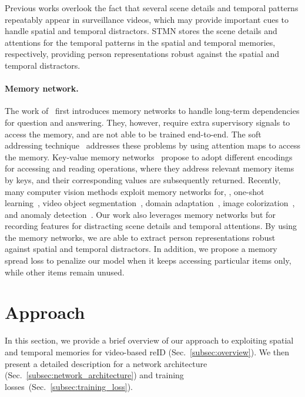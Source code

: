 \documentclass[10pt,twocolumn,letterpaper]{article}
\begin{document}
		Previous works overlook the fact that several scene details and temporal patterns repeatably appear in surveillance videos, which may provide important cues to handle spatial and temporal distractors. STMN stores the scene details and attentions for the temporal patterns in the spatial and temporal memories, respectively, providing person representations robust against the spatial and temporal distractors.
	
	\vspace{-0.4cm}
	\paragraph{Memory network.}
	
		The work of~\cite{weston2014memory} first introduces memory networks to handle long-term dependencies for question and answering. They, however, require extra supervisory signals to access the memory, and are not able to be trained end-to-end. The soft addressing technique~\cite{sukhbaatar2015end} addresses these problems by using attention maps to access the memory. Key-value memory networks~\cite{miller2016key} propose to adopt different encodings for accessing and reading operations, where they address relevant memory items by keys, and their corresponding values are subsequently returned. Recently, many computer vision methods exploit memory networks for, \eg, one-shot learning~\cite{cai2018memory}, video object segmentation~\cite{oh2019video}, domain adaptation~\cite{zhong2019invariance}, image colorization~\cite{yoo2019coloring}, and anomaly detection~\cite{gong2019memorizing,park2020learning}. Our work also leverages memory networks but for recording features for distracting scene details and temporal attentions. By using the memory networks, we are able to extract person representations robust against spatial and temporal distractors. In addition, we propose a memory spread loss to penalize our model when it keeps accessing particular items only, while other items remain unused.



\vspace{-0.3cm}
\section{Approach}
\vspace{-0.2cm}

	In this section, we provide a brief overview of our approach to exploiting spatial and temporal memories for video-based reID (Sec.~\ref{subsec:overview}). We then present a detailed description for a network architecture (Sec.~\ref{subsec:network_architecture}) and training losses~(Sec.~\ref{subsec:training_loss}).
\end{document}
